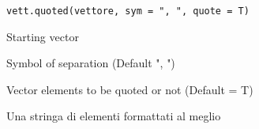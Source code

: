 \documentclass[a4paper]{book}
\begin{document}
%
\begin{Usage}
\begin{verbatim}
vett.quoted(vettore, sym = ", ", quote = T)
\end{verbatim}
\end{Usage}
%
\begin{Arguments}
\begin{ldescription}
\item[\code{vettore}] Starting vector

\item[\code{sym}] Symbol of separation (Default ", ")

\item[\code{quote}] Vector elements to be quoted or not (Default = T)
\end{ldescription}
\end{Arguments}
%
\begin{Value}
Una stringa di elementi formattati al meglio
\end{Value}
\printindex{}
\end{document}
